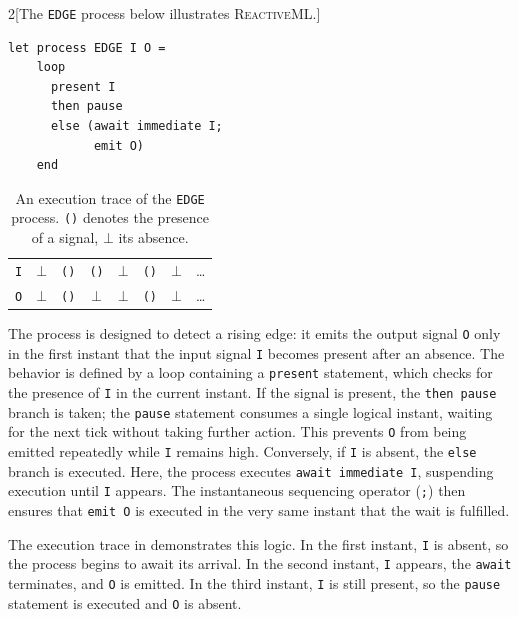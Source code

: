 \begin{multicols}{2}[The \texttt{EDGE} process below illustrates \textsc{ReactiveML}.]
  \begin{lstlisting}[basicstyle=\ttfamily\footnotesize\color{BlackText}]
  let process EDGE I O =
    loop
      present I
      then pause
      else (await immediate I;
            emit O)
    end
\end{lstlisting}

  \newcolumn

  \hfill

  \begin{table}[H]
    \centering
    \begin{tabular}{l|ccccccc}
      \texttt{I} & $\bot$ & \texttt{()} & \texttt{()} & $\bot$ & \texttt{()} & $\bot$ & \dots \\
      \texttt{O} & $\bot$ & \texttt{()} & $\bot$      & $\bot$ & \texttt{()} & $\bot$ & \dots \\
    \end{tabular}
    \caption[An execution trace of the \texttt{EDGE} process.]%
    {An execution trace of the \texttt{EDGE} process. \texttt{()} denotes the presence of a signal,
      $\bot$ its absence.}
    \label{tab:sota:synchronous:reactiveml:exec}
  \end{table}
\end{multicols}

The process is designed to detect a rising edge: it emits the output signal \texttt{O} only in the
first instant that the input signal \texttt{I} becomes present after an absence. The behavior is
defined by a loop containing a \texttt{present} statement, which checks for the presence of
\texttt{I} in the current instant. If the signal is present, the \texttt{then pause} branch is
taken; the \texttt{pause} statement consumes a single logical instant, waiting for the next tick
without taking further action. This prevents \texttt{O} from being emitted repeatedly while
\texttt{I} remains high. Conversely, if \texttt{I} is absent, the \texttt{else} branch is executed.
Here, the process executes \texttt{await immediate I}, suspending execution until \texttt{I}
appears. The instantaneous sequencing operator (\texttt{;}) then ensures that \texttt{emit O} is
executed in the very same instant that the wait is fulfilled.

The execution trace in  demonstrates this logic. In the
first instant, \texttt{I} is absent, so the process begins to await its arrival. In the second
instant, \texttt{I} appears, the \texttt{await} terminates, and \texttt{O} is emitted. In the third
instant, \texttt{I} is still present, so the \texttt{pause} statement is executed and \texttt{O} is
absent.

